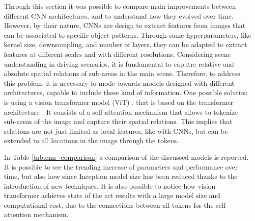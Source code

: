 Through this section it was possible to compare main improvements between 
different CNN architectures, and to understand how they evolved over time.
However, by their nature, CNNs are design to extract features from images that 
can be associated to specific object patterns. Through some hyperparameters, 
like kernel size, downsampling, and number of layers, they can be adapted to extract 
features at different scales and with different resolutions. Considering scene 
understanding in driving scenarios, it is fundamental to caputre relative and 
absolute spatial relations of sub-areas in the main scene. 
Therefore, to address this problem, it is necessary to mode towards models 
designed with different architectures, capable to include these kind of 
information. One possible solution is using a vision transformer model (ViT)
\cite{vit}, that is based on the transformer architecture 
\cite{vaswani2023attention}. It consists of a 
self-attention mechanism that allows to tokenize sub-areas of the image and 
capture their spatial relations. This implies that relations are not just 
limited as local features, like with CNNs, but can be extended to all locations 
in the image through the tokens.

In Table \ref{tab:cnn_comparison} a comparison of the discussed models is 
reported. It is possible to see the trending increase of parameters and 
performance over time, but also how since Inception model size has been reduced 
thanks to the introduction of new techniques. It is also possible to notice 
how vision transformer achieves state of the art results with a large model 
size and computational cost, due to the connections between all tokens for 
the self-attention mechanism.

